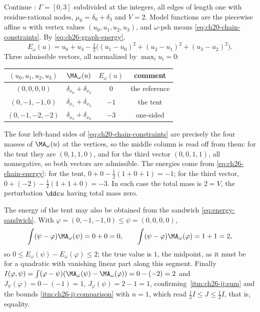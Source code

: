 \begin{example}
\label{ex:ch26-chain-energy}
Continue : $\Gamma=[0,3]$ subdivided at the
integers, all edges of length one with residue-rational nodes,
$\mu_0=\delta_0+\delta_3$ and $V=2$.
Model functions are the piecewise affine $u$ with vertex values
$(u_0,u_1,u_2,u_3)$, and $\omega$-psh means
\eqref{eq:ch20-chain-constraints}.  By \eqref{eq:ch26-graph-energy},
\begin{equation}
\label{eq:ch26-chain-energy}
 E_\omega(u)=u_0+u_3
   -\tfrac12\bigl((u_1-u_0)^2+(u_2-u_1)^2+(u_3-u_2)^2\bigr).
\end{equation}
Three admissible vectors, all normalized by $\max_iu_i=0$:
\begin{center}
\small
\begin{tabular}{c|c|c|c}
\toprule
$(u_0,u_1,u_2,u_3)$&$\MA_\omega(u)$&$E_\omega(u)$&comment\\
\midrule
$(0,0,0,0)$&$\delta_{x_0}+\delta_{x_3}$&$0$&the reference\\
$(0,-1,-1,0)$&$\delta_{x_1}+\delta_{x_2}$&$-1$&the tent\\
$(0,-1,-2,-2)$&$\delta_{x_2}+\delta_{x_3}$&$-3$&one-sided\\
\bottomrule
\end{tabular}
\end{center}
The four left-hand sides of \eqref{eq:ch20-chain-constraints} are precisely
the four masses of $\MA_\omega(u)$ at the vertices, so the middle column is
read off from them: for the tent they are $(0,1,1,0)$, and for the third
vector $(0,0,1,1)$, all nonnegative, so both vectors are admissible.  The
energies come from \eqref{eq:ch26-chain-energy}: for the tent,
$0+0-\tfrac12(1+0+1)=-1$; for the third vector,
$0+(-2)-\tfrac12(1+1+0)=-3$.  In each case the total mass is $2=V$, the
perturbation $\ddc u$ having total mass zero.

The energy of the tent may also be obtained from the sandwich
\eqref{eq:energy-sandwich}.  With $\varphi=(0,-1,-1,0)\leq\psi=(0,0,0,0)$,
\[
 \int(\psi-\varphi)\MA_\omega(\psi)=0+0=0,
 \qquad
 \int(\psi-\varphi)\MA_\omega(\varphi)=1+1=2 ,
\]
so $0\leq E_\omega(\psi)-E_\omega(\varphi)\leq2$; the true value is $1$,
the midpoint, as it must be for a quadratic with vanishing linear part along
this segment.  Finally
$I(\varphi,\psi)=\int(\varphi-\psi)(\MA_\omega(\psi)-\MA_\omega(\varphi))
=0-(-2)=2$ and
$J_\psi(\varphi)=0-(-1)=1$, $J_\varphi(\psi)=2-1=1$, confirming
\,\cref{itm:ch26-ij:sum} and the
bounds \cref{itm:ch26-ij:comparison} with $n=1$, which read
$\tfrac12I\leq J\leq\tfrac12I$, that is, equality.
\end{example}

